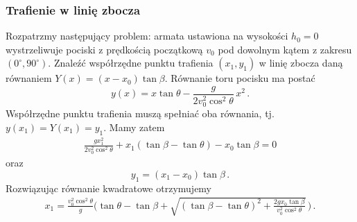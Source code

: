 \documentclass[../main.tex]{subfiles}
\begin{document}
\subsubsection*{Trafienie w linię zbocza}
Rozpatrzmy następujący problem: armata ustawiona na wysokości \(h_0=0\) wystrzeliwuje pociski z
prędkością początkową \(v_0\) pod dowolnym kątem z zakresu \((0^\circ,90^\circ)\). Znaleźć
współrzędne punktu trafienia \((x_1,y_1)\) w linię zbocza daną równaniem \(Y(x)=(x-x_0)\tan\beta\).
Równanie toru pocisku ma postać
\begin{equation*}
    y(x)=x\tan\theta-\frac{g}{2v_0^2\cos^2\theta}\,x^2\,.
\end{equation*}
Współrzędne punktu trafienia muszą spełniać oba równania, tj. \(y(x_1)=Y(x_1)=y_1\). Mamy zatem
\begin{equation*}
\begin{split}
    \frac{gx_1^2}{2v_0^2\cos^2\theta}+x_1(\tan\beta-\tan\theta)-x_0\tan\beta=0
\end{split}
\end{equation*}
oraz
\begin{equation*}
    y_1=(x_1-x_0)\tan\beta\,.
\end{equation*}
Rozwiązując równanie kwadratowe otrzymujemy
\begin{equation*}
\begin{split}
    x_1=\frac{v_0^2\cos^2\theta}{g}\Bigg(\tan\theta-\tan\beta+\sqrt{(\tan\beta-\tan\theta)^2+\frac{2gx_0\tan\beta}{v_0^2\cos^2\theta}}\,\Bigg)\,.
\end{split}
\end{equation*}
\end{document}

